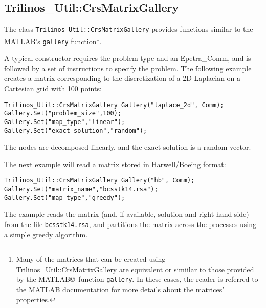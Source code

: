 
\subsection{Trilinos\_Util::CrsMatrixGallery}
\label{sec:triutils:gallery}

The class \verb!Trilinos_Util::CrsMatrixGallery! provides functions
similar to the MATLAB's \verb!gallery!  function\footnote{Many of the
  matrices that can be created using Trilinos\_Util::CrsMatrixGallery
  are equivalent or simiilar to those provided by the
  MATLAB\copyright~function {\tt gallery}. In these cases, the reader is
  referred to the MATLAB documentation for more details about the
  matrices' properties.}.

A typical constructor requires the problem type and an Epetra\_Comm, and
is followed by a set of instructions to specify the problem.  The
following example creates a matrix corresponding to the discretization
of a 2D Laplacian on a Cartesian grid with 100 points:
\begin{verbatim}
Trilinos_Util::CrsMatrixGallery Gallery("laplace_2d", Comm);
Gallery.Set("problem_size",100);
Gallery.Set("map_type","linear");
Gallery.Set("exact_solution","random");
\end{verbatim}
The nodes are decomposed linearly, and the exact solution is a random
vector.

The next example will read a matrix stored in Harwell/Boeing format:
\begin{verbatim}
Trilinos_Util::CrsMatrixGallery Gallery("hb", Comm);
Gallery.Set("matrix_name","bcsstk14.rsa");
Gallery.Set("map_type","greedy");
\end{verbatim}
The example reads the matrix (and, if available, solution and right-hand
side) from the file \verb!bcsstk14.rsa!, and partitions the matrix
across the processes using a simple greedy algorithm.

\bigskip

